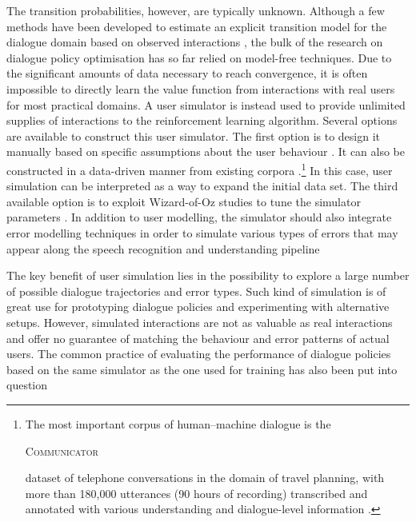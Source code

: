 The transition probabilities, however, are typically unknown.  Although a few methods have been developed to estimate an explicit transition model for the dialogue domain based on observed interactions \citep{SinghLKW02,tetreault2006using},  the bulk of the research on dialogue policy optimisation has so far relied on model-free techniques. Due to the significant amounts of data necessary to reach convergence, it is often impossible to directly learn the value function from interactions with real users for most practical domains.  A user simulator is instead used to provide unlimited supplies of interactions to the reinforcement learning algorithm.   Several options are available to construct this user simulator.  The first option is to design it manually based on specific assumptions about the user behaviour \citep{Pietquin:2006,Schatzmann:2007:AUS:1614108.1614146}.  It can also be constructed in a data-driven manner from existing corpora \citep{GeorgilaHL06}.\footnote{The most important corpus of human--machine dialogue is the \begin{small}\textsc{Communicator}\end{small} dataset of telephone conversations in the domain of travel planning, with more than 180,000 utterances (90 hours of recording) transcribed and annotated with various understanding and dialogue-level information \citep{BennettR02}.}  In this case, user simulation can be interpreted as a way to expand the initial data set.  The third available option is to exploit  Wizard-of-Oz studies to tune the simulator parameters \citep{Rieser:2010:LHM:1735495.1735497}.  In addition to user modelling, the simulator should also integrate error modelling techniques in order to simulate various types of errors that may appear along the speech recognition and understanding pipeline \citep{SchatzmannTY07,ThomsonGHTY12}

The key benefit of user simulation lies in the possibility to explore a large number of possible dialogue trajectories and error types.  Such kind of simulation is of great use for prototyping dialogue policies and experimenting with alternative setups. However, simulated interactions are not as valuable as real interactions and offer no guarantee of matching the behaviour and error patterns of actual users.  The common practice of evaluating the performance of dialogue policies based on the same simulator as the one used for training has also been put into question \citep{paek2006}


